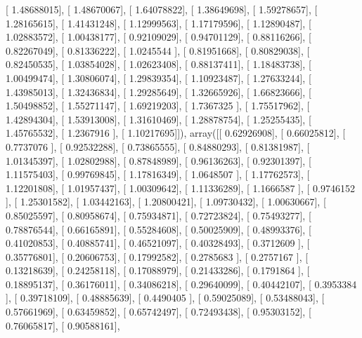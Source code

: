 \documentclass{article}
\begin{document}
       [ 1.48688015],
       [ 1.48670067],
       [ 1.64078822],
       [ 1.38649698],
       [ 1.59278657],
       [ 1.28165615],
       [ 1.41431248],
       [ 1.12999563],
       [ 1.17179596],
       [ 1.12890487],
       [ 1.02883572],
       [ 1.00438177],
       [ 0.92109029],
       [ 0.94701129],
       [ 0.88116266],
       [ 0.82267049],
       [ 0.81336222],
       [ 1.0245544 ],
       [ 0.81951668],
       [ 0.80829038],
       [ 0.82450535],
       [ 1.03854028],
       [ 1.02623408],
       [ 0.88137411],
       [ 1.18483738],
       [ 1.00499474],
       [ 1.30806074],
       [ 1.29839354],
       [ 1.10923487],
       [ 1.27633244],
       [ 1.43985013],
       [ 1.32436834],
       [ 1.29285649],
       [ 1.32665926],
       [ 1.66823666],
       [ 1.50498852],
       [ 1.55271147],
       [ 1.69219203],
       [ 1.7367325 ],
       [ 1.75517962],
       [ 1.42894304],
       [ 1.53913008],
       [ 1.31610469],
       [ 1.28878754],
       [ 1.25255435],
       [ 1.45765532],
       [ 1.2367916 ],
       [ 1.10217695]]), array([[ 0.62926908],
       [ 0.66025812],
       [ 0.7737076 ],
       [ 0.92532288],
       [ 0.73865555],
       [ 0.84880293],
       [ 0.81381987],
       [ 1.01345397],
       [ 1.02802988],
       [ 0.87848989],
       [ 0.96136263],
       [ 0.92301397],
       [ 1.11575403],
       [ 0.99769845],
       [ 1.17816349],
       [ 1.0648507 ],
       [ 1.17762573],
       [ 1.12201808],
       [ 1.01957437],
       [ 1.00309642],
       [ 1.11336289],
       [ 1.1666587 ],
       [ 0.9746152 ],
       [ 1.25301582],
       [ 1.03442163],
       [ 1.20800421],
       [ 1.09730432],
       [ 1.00630667],
       [ 0.85025597],
       [ 0.80958674],
       [ 0.75934871],
       [ 0.72723824],
       [ 0.75493277],
       [ 0.78876544],
       [ 0.66165891],
       [ 0.55284608],
       [ 0.50025909],
       [ 0.48993376],
       [ 0.41020853],
       [ 0.40885741],
       [ 0.46521097],
       [ 0.40328493],
       [ 0.3712609 ],
       [ 0.35776801],
       [ 0.20606753],
       [ 0.17992582],
       [ 0.2785683 ],
       [ 0.2757167 ],
       [ 0.13218639],
       [ 0.24258118],
       [ 0.17088979],
       [ 0.21433286],
       [ 0.1791864 ],
       [ 0.18895137],
       [ 0.36176011],
       [ 0.34086218],
       [ 0.29640099],
       [ 0.40442107],
       [ 0.3953384 ],
       [ 0.39718109],
       [ 0.48885639],
       [ 0.4490405 ],
       [ 0.59025089],
       [ 0.53488043],
       [ 0.57661969],
       [ 0.63459852],
       [ 0.65742497],
       [ 0.72493438],
       [ 0.95303152],
       [ 0.76065817],
       [ 0.90588161],
\end{document}
